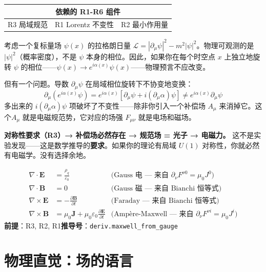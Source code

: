 \begin{center}
\small
\begin{tabular}{p{4cm}p{4cm}p{3cm}}
\toprule
\multicolumn{3}{c}{\textbf{依赖的 R1-R6 组件}} \\
\midrule
R3 局域规范 & R1 Lorentz 不变性 & R2 最小作用量 \\
\bottomrule
\end{tabular}
\end{center}

\begin{insightbox}[规范不变性如何逼出电磁力]
  考虑一个复标量场 $\psi(x)$ 的拉格朗日量 $\mathcal{L} = |\partial_\mu\psi|^2 - m^2|\psi|^2$。物理可观测的是 $|\psi|^2$（概率密度），不是 $\psi$ 本身的相位。因此，如果你在每个时空点 $x$ 上独立地旋转 $\psi$ 的相位——$\psi(x) \to e^{i\alpha(x)}\psi(x)$——物理预言不应改变。

  但有一个问题。导数 $\partial_\mu\psi$ 在局域相位旋转下不协变地变换：
  \[
  \partial_\mu(e^{i\alpha(x)}\psi) = e^{i\alpha(x)}[\partial_\mu\psi + i(\partial_\mu\alpha)\psi] \neq e^{i\alpha(x)}\partial_\mu\psi
  \]
  多出来的 $i(\partial_\mu\alpha)\psi$ 项破坏了不变性——除非你引入一个补偿场 $A_\mu$ 来消掉它。这个$A_\mu$ 就是电磁规范势，它对应的场强 $F_{\mu\nu}$ 就是电场和磁场。

  \textbf{对称性要求（R3）→ 补偿场必然存在 → 规范场 = 光子 → 电磁力。}
  这不是实验发现——这是数学推导的\textbf{要求}。如果你的理论有局域 $U(1)$ 对称性，你就必然有电磁学。没有选择余地。
\end{insightbox}

\begin{lawbox}
  \begin{align*}
    \nabla\cdot\mathbf{E} &= \frac{\rho_q}{\varepsilon_0} &\text{(Gauss 电 — 来自 $\partial_\nu F^{\nu 0} = \mu_0 J^0$)}\\
    \nabla\cdot\mathbf{B} &= 0 &\text{(Gauss 磁 — 来自 Bianchi 恒等式)}\\
    \nabla\times\mathbf{E} &= -\frac{\partial\mathbf{B}}{\partial t} &\text{(Faraday — 来自 Bianchi 恒等式)}\\
    \nabla\times\mathbf{B} &= \mu_0\mathbf{J} + \mu_0\varepsilon_0\frac{\partial\mathbf{E}}{\partial t} &\text{(Amp\`{e}re-Maxwell — 来自 $\partial_\nu F^{\nu i} = \mu_0 J^i$)}
  \end{align*}
  \textbf{前提}：R3, R2, R1\quad\textbf{推导号}：\texttt{deriv.maxwell\_from\_gauge}
\end{lawbox}

\section{物理直觉：场的语言}


